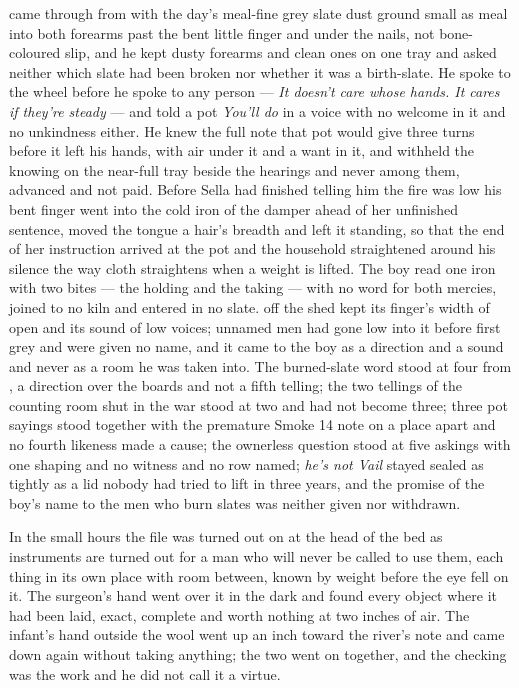  came through from  with the day's meal-fine grey slate dust ground small as meal into both forearms past the bent little finger and under the nails, not bone-coloured slip, and he kept dusty forearms and clean ones on one tray and asked neither which slate had been broken nor whether it was a birth-slate. He spoke to the wheel before he spoke to any person --- \emph{It doesn't care whose hands. It cares if they're steady} --- and told a pot \emph{You'll do} in a voice with no welcome in it and no unkindness either. He knew the full note that pot would give three turns before it left his hands, with air under it and a want in it, and withheld the knowing on the near-full tray beside the hearings and never among them, advanced and not paid. Before Sella had finished telling him the fire was low his bent finger went into the cold iron of the damper ahead of her unfinished sentence, moved the tongue a hair's breadth and left it standing, so that the end of her instruction arrived at the pot and the household straightened around his silence the way cloth straightens when a weight is lifted. The boy read one iron with two bites --- the holding and the taking --- with no  word for both mercies, joined to no kiln and entered in no slate.  off the shed kept its finger's width of open and its sound of low voices; unnamed men had gone low into it before first grey and were given no name, and it came to the boy as a direction and a sound and never as a room he was taken into. The burned-slate word stood at four from , a direction over the boards and not a fifth telling; the two tellings of the counting room shut in the war stood at two and had not become three; three pot sayings stood together with the premature Smoke 14 note on a place apart and no fourth likeness made a cause; the ownerless question stood at five askings with one shaping and no witness and no row named; \emph{he's not Vail} stayed sealed as tightly as a lid nobody had tried to lift in three years, and the promise of the boy's name to the men who burn slates was neither given nor withdrawn.

\scenebreak

In the small hours the file was turned out on  at the head of the bed as instruments are turned out for a man who will never be called to use them, each thing in its own place with room between, known by weight before the eye fell on it. The surgeon's hand went over it in the dark and found every object where it had been laid, exact, complete and worth nothing at two inches of air. The infant's hand outside the wool went up an inch toward the river's note and came down again without taking anything; the two went on together, and the checking was the work and he did not call it a virtue.

